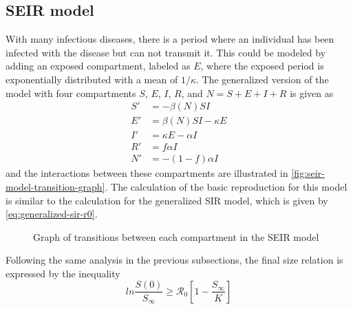 \subsection{SEIR model}
\label{sec:literature-review-compartmental-seir-model}

With many infectious diseases, there is a period where an individual has been infected with the disease but can not transmit it.
This could be modeled by adding an exposed compartment, labeled as $E$, where the exposed period is exponentially distributed with a mean of $1 / \kappa$.
The generalized version of the model with four compartments $S$, $E$, $I$, $R$, and $N = S + E + I + R$ is given as \cite{brauerCompartmentalModelsEpidemiology2008}
\begin{equation}
    \begin{aligned}
        S' &= - \beta(N)SI \\
        E' &= \beta(N)SI - \kappa E \\
        I' &= \kappa E - \alpha I \\
        R' &= f \alpha I \\
        N' &= - (1 - f) \alpha I
    \end{aligned}
\end{equation}
and the interactions between these compartments are illustrated in \autoref{fig:seir-model-transition-graph}.
The calculation of the basic reproduction for this model is similar to the calculation for the generalized \gls{SIR} model, which is given by \autoref{eq:generalized-sir-r0}.

\begin{figure}
    \centering
    \caption[SEIR model transitions]{Graph of transitions between each compartment in the SEIR model}
    \label{fig:seir-model-transition-graph}
\end{figure}

Following the same analysis in the previous subsections, the final size relation is expressed by the inequality \cite{brauerCompartmentalModelsEpidemiology2008}
\begin{equation}
    ln \frac{S(0)}{S_\infty} \geq \mathcal{R}_0 \left[ 1 - \frac{S_\infty}{K} \right]
\end{equation}

